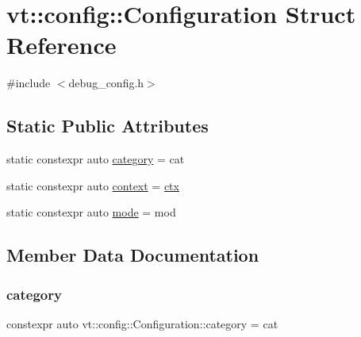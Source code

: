\hypertarget{structvt_1_1config_1_1_configuration}{}\section{vt\+:\+:config\+:\+:Configuration Struct Reference}
\label{structvt_1_1config_1_1_configuration}


{\ttfamily \#include $<$debug\+\_\+config.\+h$>$}

\subsection*{Static Public Attributes}
\begin{DoxyCompactItemize}
\item 
static constexpr auto \hyperlink{structvt_1_1config_1_1_configuration_ab1a561a6e497fe269eae090de3a56e4e}{category} = cat
\item 
static constexpr auto \hyperlink{structvt_1_1config_1_1_configuration_afb853fae433b15ebdb22a19a96423b23}{context} = \hyperlink{namespacevt_1_1config_a0551245b6b893932b95aaf8eac94eed1}{ctx}
\item 
static constexpr auto \hyperlink{structvt_1_1config_1_1_configuration_afaa170a7f047944c3ba69cc3aa624ab0}{mode} = mod
\end{DoxyCompactItemize}


\subsection{Member Data Documentation}
\mbox{\label{structvt_1_1config_1_1_configuration_ab1a561a6e497fe269eae090de3a56e4e}} 
\subsubsection{\texorpdfstring{category}{category}}
{\footnotesize\ttfamily constexpr auto vt\+::config\+::\+Configuration\+::category = cat\hspace{0.3cm}{\ttfamily [static]}}

\mbox{\label{structvt_1_1config_1_1_configuration_afb853fae433b15ebdb22a19a96423b23}} 
